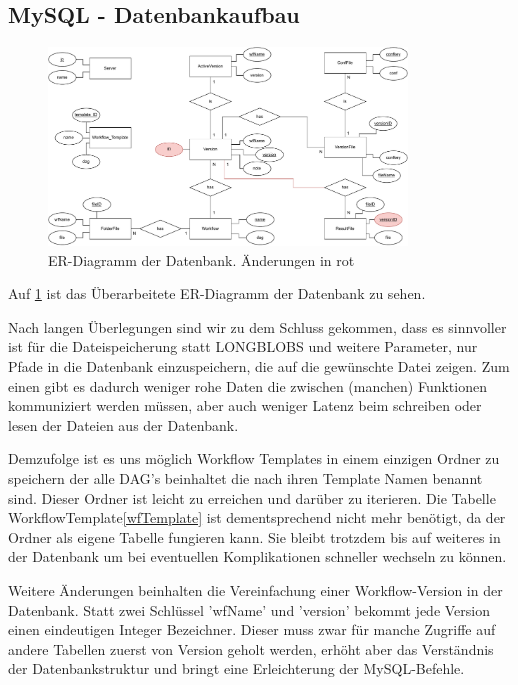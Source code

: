 \subsection{MySQL - Datenbankaufbau}

\begin{figure}[h]
	\centering
	\includegraphics[width=0.85\textwidth]{res/er_diagram.pdf} 
	\caption{ER-Diagramm der Datenbank. Änderungen in rot}
	\label{fig:er_diagram}
\end{figure}

Auf \ref{fig:er_diagram} ist das Überarbeitete ER-Diagramm der Datenbank zu sehen.

Nach langen Überlegungen sind wir zu dem Schluss gekommen, dass es sinnvoller ist für die Dateispeicherung statt LONGBLOBS und weitere Parameter, nur Pfade in die Datenbank einzuspeichern, die auf die gewünschte Datei zeigen. Zum einen gibt es dadurch weniger rohe Daten die zwischen (manchen) Funktionen kommuniziert werden müssen, aber auch weniger Latenz beim schreiben oder lesen der Dateien aus der Datenbank.

\label{template_gone}Demzufolge ist es uns möglich Workflow Templates in einem einzigen Ordner zu speichern der alle DAG's beinhaltet die nach ihren Template Namen benannt sind. Dieser Ordner ist leicht zu erreichen und darüber zu iterieren. Die Tabelle Workflow\textunderscore Template\ref{wfTemplate} ist dementsprechend nicht mehr benötigt, da der Ordner als eigene Tabelle fungieren kann. Sie bleibt trotzdem bis auf weiteres in der Datenbank um bei eventuellen Komplikationen schneller wechseln zu können.


Weitere Änderungen beinhalten die Vereinfachung einer Workflow-Version in der Datenbank. Statt zwei Schlüssel 'wfName' und 'version' bekommt jede Version einen eindeutigen Integer Bezeichner. Dieser muss zwar für manche Zugriffe auf andere Tabellen zuerst von Version geholt werden, erhöht aber das Verständnis der Datenbankstruktur und bringt eine Erleichterung der MySQL-Befehle.

